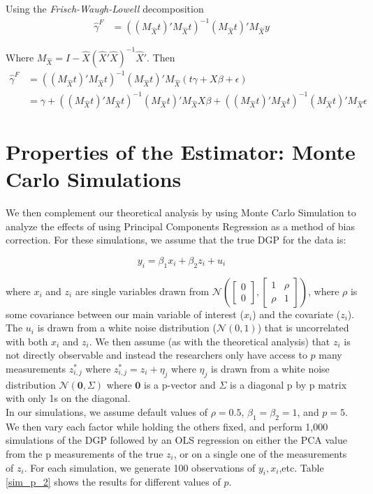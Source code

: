 \documentclass[12pt]{article}
\def\g{\gamma}
\begin{document}
Using the \textit{Frisch-Waugh-Lowell} decomposition
\begin{align}
    \hat{\g}^F & = ((M_{\hat{X}}t)'M_{\hat{X}}t)^{-1}(M_{\hat{X}}t)'M_{\hat{X}}y
\end{align}

Where $M_{\hat{X}}=I-\hat{X}(\hat{X}'\hat{X})^{-1}\hat{X}'$. Then
\begin{align}
     \hat{\g}^F & = ((M_{\hat{X}}t)'M_{\hat{X}}t)^{-1}(M_{\hat{X}}t)'M_{\hat{X}}(t\gamma  + X\beta + \epsilon) \\
     &=\gamma +((M_{\hat{X}}t)'M_{\hat{X}}t)^{-1}(M_{\hat{X}}t)'M_{\hat{X}}X\beta+((M_{\hat{X}}t)'M_{\hat{X}}t)^{-1}(M_{\hat{X}}t)'M_{\hat{X}}\epsilon
\end{align}

    \section*{Properties of the Estimator: Monte Carlo Simulations}

        We then complement our theoretical analysis by using Monte Carlo Simulation to analyze the effects of using Principal Components Regression as a method of bias correction. For these simulations, we assume that the true DGP for the data is:

        $$y_i = \beta_1 x_i + \beta_2 z_i + u_i$$

        where $x_i$ and $z_i$ are single variables drawn from $\mathcal{N}(\begin{bmatrix} 0\\ 0 \end{bmatrix}, \begin{bmatrix} 1 & \rho\\ \rho & 1\end{bmatrix})$, where $\rho$ is some covariance between our main variable of interest ($x_i$) and the covariate ($z_i$). The $u_i$ is drawn from a white noise distribution ($\mathcal{N}(0,1)$) that is uncorrelated with both $x_i$ and $z_i$. We then assume (as with the theoretical analysis) that $z_i$ is not directly observable and instead the researchers only have access to $p$ many measurements $z_{i,j}^*$ where $z_{i,j}^* = z_i + \eta_j$ where $\eta_j$ is drawn from a white noise distribution $\mathcal{N}(\mathbf{0},\Sigma)$ where $\mathbf{0}$ is a p-vector and $\Sigma$ is a diagonal p by p matrix with only 1s on the diagonal.\\
        
        In our simulations, we assume default values of $\rho = 0.5$, $\beta_1 = \beta_2 = 1$, and $p=5$. We then vary each factor while holding the others fixed, and perform 1,000 simulations of the DGP followed by an OLS regression on either the PCA value from the p measurements of the true $z_i$, or on a single one of the measurements of $z_i$. For each simulation, we generate 100 observations of $y_i,x_i$,etc. Table \ref{sim_p_2} shows the results for different values of $p$.
\end{document}
